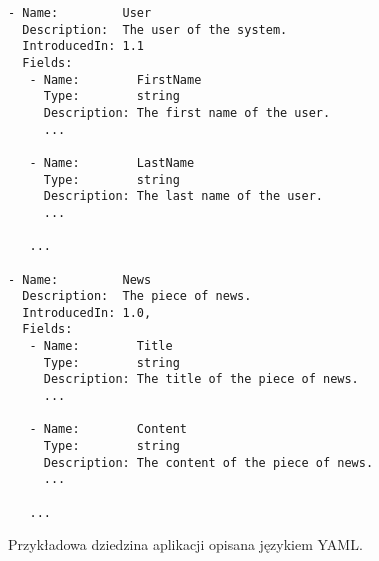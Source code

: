 \begin{figure}[!ht]
\begin{verbatim}
- Name:         User
  Description:  The user of the system.
  IntroducedIn: 1.1
  Fields:
   - Name:        FirstName
     Type:        string
     Description: The first name of the user.
     ...
     
   - Name:        LastName
     Type:        string
     Description: The last name of the user.
     ...
     
   ...
   
- Name:         News
  Description:  The piece of news.
  IntroducedIn: 1.0,
  Fields:
   - Name:        Title
     Type:        string
     Description: The title of the piece of news.
     ...
     
   - Name:        Content
     Type:        string
     Description: The content of the piece of news.
     ...
     
   ...
\end{verbatim}

\caption{Przykładowa dziedzina aplikacji opisana językiem YAML.}
\label{fig:implementation_core:yaml}
\end{figure}
